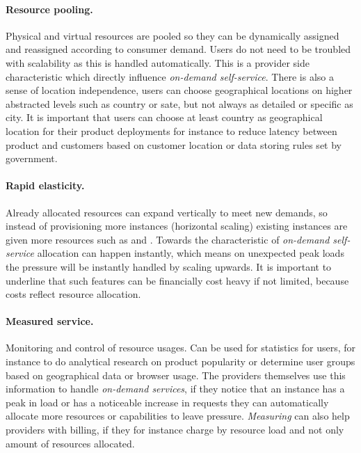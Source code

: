 \paragraph{Resource pooling.}

Physical and virtual resources are pooled so they can be 
dynamically assigned and reassigned according to consumer demand.
Users do not need to be troubled with scalability as this is handled automatically.
This is a provider side characteristic which directly influence \emph{on-demand self-service}.
There is also a sense of location independence, users can choose geographical locations
on higher abstracted levels such as country or sate, but not always as detailed or specific as city.
It is important that users can choose at least country as geographical location
for their product deployments for instance to reduce latency between product and customers
based on customer location or data storing rules set by government.

\paragraph{Rapid elasticity.}

Already allocated resources can expand vertically to meet new demands,
so instead of provisioning more instances (horizontal scaling) existing
instances are given more resources such as  and .
Towards the characteristic of \emph{on-demand self-service} allocation
can happen instantly, which means on unexpected peak loads the pressure will be
instantly handled by scaling upwards.
It is important to underline that such features can be financially cost heavy if not limited,
because costs reflect resource allocation.

\paragraph{Measured service.}

Monitoring and control of resource usages.
Can be used for statistics for users, for instance to do analytical research on product popularity
or determine user groups based on geographical data or browser usage.
The providers themselves use this information to handle \emph{on-demand services},
if they notice that an instance has a peak in load or has a noticeable increase 
in requests they can automatically allocate more resources or capabilities 
to leave pressure.
\emph{Measuring} can also help providers with billing, if they for instance
charge by resource load and not only amount of resources allocated.

